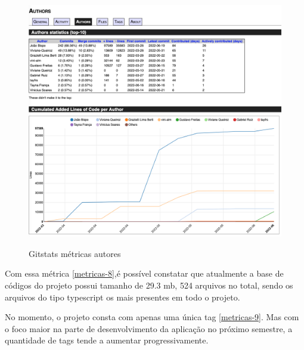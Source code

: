\begin{figure}[htb]
	\centering
	\caption{\label{fig_arq_virado}Gitstats métricas autores}
	\includegraphics[width=1.00\textwidth]{anexos/metricas7.png}
	\label{metricas-7}
\end{figure}

Com essa métrica  \autoref{metricas-8},é possível constatar que atualmente a base de códigos do projeto possui tamanho de 29.3 \ac{mb}, 524 arquivos no total, sendo os arquivos do tipo typescript os mais presentes em todo o projeto. 

\pagebreak



No momento, o projeto consta com apenas uma única tag \autoref{metricas-9}. Mas com o foco maior na parte de desenvolvimento da aplicação no próximo semestre, a quantidade de tags tende a aumentar progressivamente.


